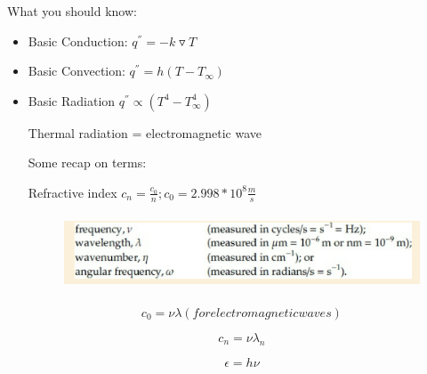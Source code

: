 \documentclass[12pt]{article}
\renewcommand{\_}{\kern-1.5pt\textunderscore\kern-1.5pt}
\begin{document}
\vspace{\baselineskip}
What you should know:\par

\begin{itemize}
	\item Basic Conduction:  \( q^{''}=-k\triangledown T \) \par

	\item Basic Convection:  \( q^{''}=h \left( T-T_{\infty} \right)  \) \par

	\item Basic Radiation  \( q^{''}\propto \left( T^{4}-T_{\infty}^{4} \right)  \) \par


\vspace{\baselineskip}
Thermal radiation = electromagnetic wave\par


\vspace{\baselineskip}
Some recap on terms:\par

Refractive index  \( c_{n}=\frac{c_{0}}{n};c_{0}=2.998\ast10^{8}\frac{m}{s}~ \) \par




\begin{figure}[H]
	\begin{Center}
		\includegraphics[width=5.02in,height=0.89in]{./media/image2.png}
	\end{Center}
\end{figure}



\par

 \[ c_{0}= \nu  \lambda   \left( for electromagnetic waves \right)  \] \par

 \[ c_{n}= \nu  \lambda _{n} \] \par

 \[  \epsilon =h \nu  \] \par


\end{itemize}
\end{document}

